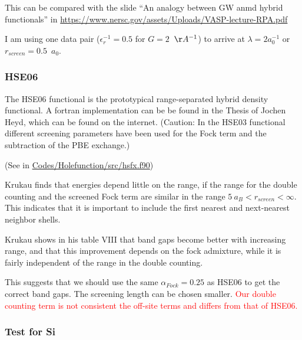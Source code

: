 \documentclass[11pt,a4paper]{report}
\begin{document}
This can be compared with the slide ``An analogy between GW anmd
hybrid functionals'' in
\url{https://www.nersc.gov/assets/Uploads/VASP-lecture-RPA.pdf}

I am using one data pair ($\epsilon_r^{-1}=0.5$ for $G=2$~$\AA^{-1}$)
to arrive at $\lambda=2 a_0^{-1}$ or $r_{screen}=0.5$~$a_0$.





\subsubsection{HSE06}
The HSE06 functional is the prototypical range-separated hybrid
density functional. A fortran implementation can be be found in the
Thesis of Jochen Heyd, which can be found on the internet.  (Caution:
In the HSE03 functional different screening parameters have been used
for the Fock term and the subtraction of the PBE exchange.)

(See in \url{Codes/Holefunction/src/hsfx.f90})

Krukau\cite{krukau06_jcp125_224106} finds that energies depend little
on the range, if the range for the double counting and the screened
Fock term are similar in the range $5~a_B<r_{screen}<\infty$. This
indicates that it is important to include the first nearest and
next-nearest neighbor shells.

Krukau\cite{krukau06_jcp125_224106} shows in his table VIII that band
gaps become better with increasing range, and that this improvement
depends on the fock admixture, while it is fairly independent of the
range in the double counting.


This suggests that we should use the same $\alpha_{Fock}=0.25$ as
HSE06 to get the correct band gaps. The screening length can be chosen
smaller. \textcolor{red}{Our double counting term is not consistent
  the off-site terms and differs from that of HSE06.}



\subsubsection{Test for Si}
\end{document}
